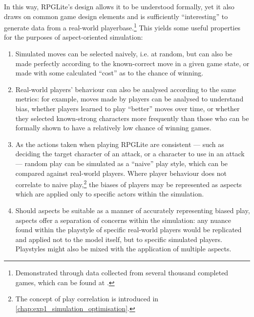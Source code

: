 In this way, RPGLite's design allows it to be understood formally, yet it also
draws on common game design elements and is sufficiently ``interesting'' to
generate data from a real-world playerbase.\footnote{Demonstrated through data
collected from several thousand completed games, which can be found at
\cite{rpglite_dataset}.} This yields some useful properties for the purposes of
aspect-oriented simulation:

\begin{enumerate} \item Simulated moves can be selected naively, i.e. at random,
but can also be made perfectly according to the known-correct move in a given
game state, or made with some calculated ``cost'' as to the chance of winning.
\item Real-world players' behaviour can also be analysed according to the same
metrics: for example, moves made by players can be analysed to understand bias,
whether players learned to play ``better'' moves over time, or whether they
selected known-strong characters more frequently than those who can be formally
shown to have a relatively low chance of winning games.  \item As the actions
taken when playing RPGLite are consistent --- such as deciding the target
character of an attack, or a character to use in an attack --- random play can
be simulated as a ``naive'' play style, which can be compared against real-world
players. Where player behaviour does not correlate to naive
play,\footnote{The
concept of play correlation is introduced in
\cref{chap:exp1_simulation_optimisation}.} the biases of players may be
represented as aspects which are applied only to specific actors within the
simulation.  \item Should aspects be suitable as a manner of accurately
representing biased play, aspects offer a separation of concerns within the
simulation: any nuance found within the playstyle of specific real-world players
would be replicated and applied not to the model itself, but to specific
simulated players. Playstyles might also be mixed with the application of
multiple aspects.  \end{enumerate}

